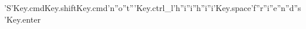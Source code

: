 'S'Key.cmdKey.shiftKey.cmd'n''o''t'''Key.ctrl_l'h''i''i''h''i''i'Key.space'f''r''i''e''n''d''s'Key.enter
